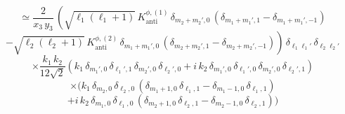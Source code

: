 \newpage
%
%
\begin{equation*}
\simeq
\frac{2}{x_3 \, y_3} \,
\left(
\sqrt{\ell_1 (\ell_1 + 1)} \,
K^{\phi,(1)}_{\mathrm{anti}}  \,
\delta_{m_2 + m_2',0} \,
(\delta_{m_1 + m_1',1} - \delta_{m_1 + m_1',-1})
\right.
\end{equation*}
%
%
\begin{equation*}
\left.
- \sqrt{\ell_2 (\ell_2 + 1)} \,
K^{\phi,(2)}_{\mathrm{anti}}  \,
\delta_{m_1+m_1',0} \,
(\delta_{m_2 + m_2',1} - \delta_{m_2 + m_2',-1})
\right) \,
\delta_{\ell_1 \ell_1'} \, \delta_{\ell_2 \ell_2'}
\end{equation*}
%
%
\begin{equation*}
\times
\frac{k_1 \, k_2}{12 \sqrt{2}}
\left(
k_1 \, 
\delta_{m_1',0} \, \delta_{\ell_1',1} \, \delta_{m_2',0} \, \delta_{\ell_2',0}
+
i \, k_2 \,
\delta_{m_1',0} \, \delta_{\ell_1',0} \, \delta_{m_2',0} \, \delta_{\ell_2',1}
\right)
\end{equation*}
%
%
\begin{equation*}
\times
\Big(
k_1 \,
\delta_{m_2,0} \, \delta_{\ell_2,0} \,
(\delta_{m_1+1,0} \, \delta_{\ell_1, 1}
-
\delta_{m_1-1,0} \, \delta_{\ell_1, 1})
\end{equation*}
%
%
\begin{equation*}
+
i \, k_2 \,
\delta_{m_1,0} \, \delta_{\ell_1,0} \,
(\delta_{m_2+1,0} \, \delta_{\ell_2, 1}
-
\delta_{m_2-1,0} \, \delta_{\ell_2, 1})
\Big)
\end{equation*}
%
%

